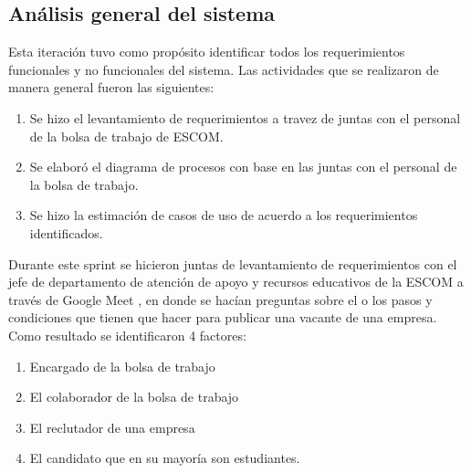 \subsection{Análisis general del sistema}
    Esta iteración tuvo como propósito identificar todos los requerimientos funcionales y no funcionales del sistema. 
    Las actividades que se realizaron de manera general fueron las siguientes:
    \begin{enumerate}
        \item Se hizo el levantamiento de requerimientos a travez de juntas con el personal de la bolsa de trabajo de ESCOM.
        \item Se elaboró el diagrama de procesos con base en las juntas con el personal de la bolsa de trabajo.
        \item Se hizo la estimación de casos de uso de acuerdo a los requerimientos identificados.
    \end{enumerate} 

    Durante este sprint  se hicieron juntas de levantamiento de requerimientos con el jefe de departamento de atención de apoyo y recursos educativos de la ESCOM  a través de Google Meet , en donde se hacían preguntas sobre el o los pasos y condiciones que tienen que hacer para publicar una vacante de una empresa.
    Como resultado se identificaron 4  factores:
    \begin{enumerate}
        \item Encargado de la bolsa de trabajo
        \item El colaborador de la bolsa de trabajo
        \item El reclutador de una empresa 
        \item El candidato que en su mayoría son estudiantes.
    \end{enumerate} 

